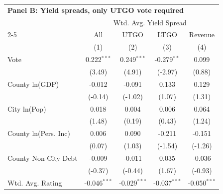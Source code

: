 \begingroup
\centering
\begin{tabular*}{\textwidth}{@{\extracolsep{\fill}}lcccc}
\multicolumn{5}{l}{\textbf{Panel B: Yield spreads, only UTGO vote required}}\\

\addlinespace
   \toprule
                               & \multicolumn{4}{c}{Wtd. Avg. Yield Spread}\\  
   \cmidrule(lr){2-5}
                               & All                    & UTGO                          & LTGO                          & Revenue \\   
                               & (1)                    & (2)                           & (3)                           & (4)\\  
   \midrule 
   Vote                        & 0.222$^{***}$          & 0.249$^{***}$                 & -0.279$^{**}$                 & 0.099\\   
                               & (3.49)                & (4.91)                       & (-2.97)                      & (0.88)\\   
   County ln(GDP)              & -0.012                 & -0.091                        & 0.133                         & 0.129\\   
                               & (-0.14)               & (-1.02)                      & (1.07)                       & (1.31)\\   
   City ln(Pop)                & 0.018                  & 0.004                         & 0.006                         & 0.064\\   
                               & (1.48)                & (0.19)                       & (0.43)                       & (1.24)\\   
   County ln(Pers. Inc)        & 0.006                  & 0.090                         & -0.211                        & -0.151\\   
                               & (0.07)                & (1.03)                       & (-1.54)                      & (-1.26)\\   
   County Non-City Debt        & -0.009                 & -0.011                        & 0.035                         & -0.036\\   
                               & (-0.37)               & (-0.44)                      & (1.67)                       & (-0.93)\\   
   Wtd. Avg. Rating            & -0.046$^{***}$         & -0.029$^{***}$                & -0.037$^{***}$                & -0.050$^{***}$\\   

\end{tabular*}
